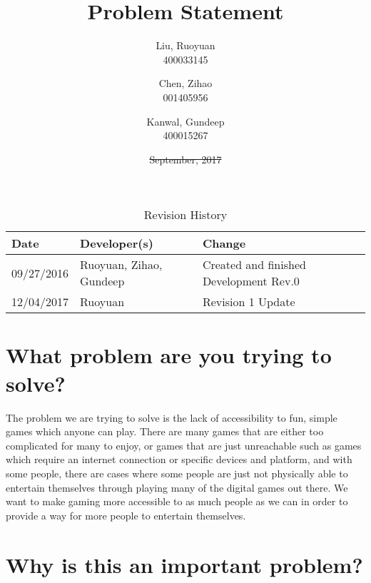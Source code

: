 \documentclass{article}
\title{Problem Statement
}
\author{Liu, Ruoyuan\\
		400033145
		\and
		Chen, Zihao\\
		001405956
		\and
		Kanwal, Gundeep\\
		400015267}
\date{\sout{September, 2017}\rev{December 6, 2017}}
\newcommand{\rev}[1]{\textcolor{RevisionColour}{#1}}
\begin{document}
\maketitle

\newpage
\begin{table}[hp]
	\caption{Revision History} \label{TblRevisionHistory}
	\begin{tabularx}{\textwidth}{llX}
		\toprule
		\textbf{Date} & \textbf{Developer(s)} & \textbf{Change}\\
		\midrule
		09/27/2016 & Ruoyuan, Zihao, Gundeep & Created and finished Development Rev.0\\
		\rev{12/04/2017} & \rev{Ruoyuan} & \rev{Revision 1 Update}\\
		\bottomrule
	\end{tabularx}
\end{table}




\section{What problem are you trying to solve?}

\newcommand*\apos{\textsc{\char13}}
The problem we are trying to solve is the lack of accessibility to fun, simple games which anyone can play. There are many games that are either too complicated for many to enjoy, or games that are just unreachable such as games which require an internet connection \rev{or specific devices and platform}, and with some people, there are cases where some people are just not physically able to entertain themselves through playing many of the digital games out there. We want to make gaming more accessible to as much people as we can in order to provide a way for more people to entertain themselves.

\section{Why is this an important problem?}
\end{document}

